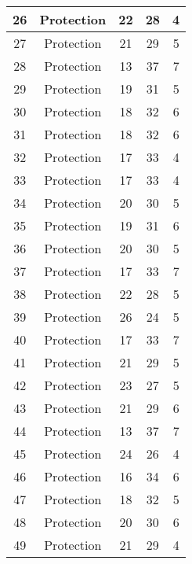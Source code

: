 \documentclass[results.tex]{subfiles}
\begin{document}
\begin{center}
\begin{tabular}{| c || c | c | c | c |}
    \hline
    26 & Protection & 22 & 28 & 4 \\ 
    \hline
    27 & Protection & 21 & 29 & 5 \\ 
    \hline
    28 & Protection & 13 & 37 & 7 \\ 
    \hline
    29 & Protection & 19 & 31 & 5 \\ 
    \hline
    30 & Protection & 18 & 32 & 6 \\ 
    \hline
    31 & Protection & 18 & 32 & 6 \\ 
    \hline
    32 & Protection & 17 & 33 & 4 \\ 
    \hline
    33 & Protection & 17 & 33 & 4 \\ 
    \hline
    34 & Protection & 20 & 30 & 5 \\ 
    \hline
    35 & Protection & 19 & 31 & 6 \\ 
    \hline
    36 & Protection & 20 & 30 & 5 \\ 
    \hline
    37 & Protection & 17 & 33 & 7 \\ 
    \hline
    38 & Protection & 22 & 28 & 5 \\ 
    \hline
    39 & Protection & 26 & 24 & 5 \\ 
    \hline
    40 & Protection & 17 & 33 & 7 \\ 
    \hline
    41 & Protection & 21 & 29 & 5 \\ 
    \hline
    42 & Protection & 23 & 27 & 5 \\ 
    \hline
    43 & Protection & 21 & 29 & 6 \\ 
    \hline
    44 & Protection & 13 & 37 & 7 \\ 
    \hline
    45 & Protection & 24 & 26 & 4 \\ 
    \hline
    46 & Protection & 16 & 34 & 6 \\ 
    \hline
    47 & Protection & 18 & 32 & 5 \\ 
    \hline
    48 & Protection & 20 & 30 & 6 \\ 
    \hline
    49 & Protection & 21 & 29 & 4 \\ 
    \hline   \end{tabular}
\end{center}
\end{document}

